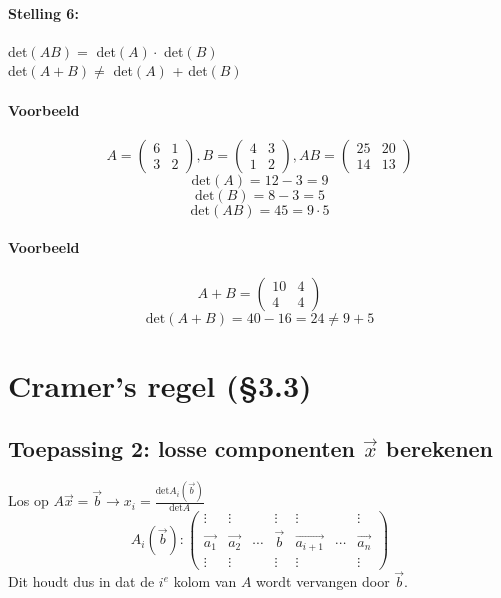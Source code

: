 \paragraph{Stelling 6:} 
det$(AB) =$ det$(A) \cdot$ det$(B)$ \\
det$(A + B) \neq$ det$(A)$ + det$(B)$

\paragraph{Voorbeeld}
\[ A = \begin{pmatrix} 6 & 1 \\ 3 & 2 \end{pmatrix}, B = \begin{pmatrix} 4 & 3 \\ 1 & 2 \end{pmatrix}, AB = \begin{pmatrix} 25 & 20 \\ 14 & 13 \end{pmatrix} \]
\[ \mbox{det}(A) = 12 - 3 = 9 \]
\[ \mbox{det}(B) = 8 - 3 = 5 \]
\[ \mbox{det}(AB) = 45 = 9 \cdot 5 \]

\paragraph{Voorbeeld}\[ A + B = \begin{pmatrix} 10 & 4 \\ 4 & 4 \end{pmatrix} \]
\[ \mbox{det}(A+B) = 40-16 = 24 \neq 9 + 5\]

\section{Cramer's regel (\S3.3)}
\subsection{Toepassing 2: losse componenten $\vec{x}$ berekenen}
Los op $A \vec{x} = \vec{b} \to x_i = \frac{\mbox{det}A_i(\vec{b})}{\mbox{det}A}$
\[A_i(\vec{b}): \begin{pmatrix}
	\vdots & \vdots & & \vdots & \vdots & & \vdots \\
	\vec{a_1} & \vec{a_2} & \cdots & \vec{b} & \vec{a_{i + 1}} & \cdots & \vec{a_n} \\
	\vdots & \vdots & & \vdots & \vdots & & \vdots
\end{pmatrix}\]
Dit houdt dus in dat de $i^e$ kolom van $A$ wordt vervangen door $\vec{b}$.

